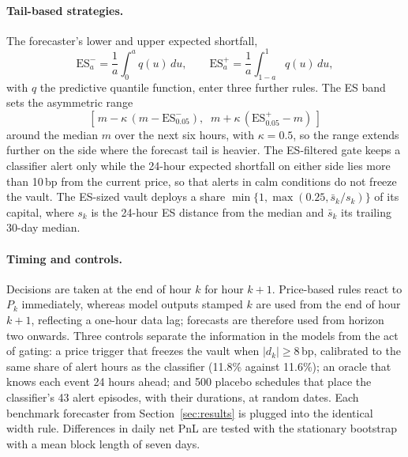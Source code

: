 \paragraph{Tail-based strategies.} The forecaster's lower and upper expected shortfall,
\begin{equation}
\mathrm{ES}^{-}_{a}=\frac{1}{a}\int_0^{a}q(u)\,du,\qquad
\mathrm{ES}^{+}_{a}=\frac{1}{a}\int_{1-a}^{1}q(u)\,du,
\end{equation}
with $q$ the predictive quantile function, enter three further rules. The ES band sets the asymmetric range
\begin{equation}
\left[\,m-\kappa\,(m-\mathrm{ES}^{-}_{0.05}),\;\; m+\kappa\,(\mathrm{ES}^{+}_{0.05}-m)\,\right]
\end{equation}
around the median $m$ over the next six hours, with $\kappa=0.5$, so the range extends further on
the side where the forecast tail is heavier. The ES-filtered gate keeps a classifier alert only
while the 24-hour expected shortfall on either side lies more than 10\,bp from the current
price, so that alerts in calm conditions do not freeze the vault. The ES-sized vault deploys a
share $\min\{1,\max(0.25,\bar s_k/s_k)\}$ of its capital, where $s_k$ is the 24-hour ES
distance from the median and $\bar s_k$ its trailing 30-day median.

\paragraph{Timing and controls.} Decisions are taken at the end of hour $k$ for hour $k+1$.
Price-based rules react to $P_k$ immediately, whereas model outputs stamped $k$ are used from
the end of hour $k+1$, reflecting a one-hour data lag; forecasts are therefore used from
horizon two onwards. Three controls separate the information in the models from the act of
gating: a price trigger that freezes the vault when $|d_k|\ge 8$\,bp, calibrated to the same
share of alert hours as the classifier (11.8\% against 11.6\%); an oracle that knows each
event 24 hours ahead; and 500 placebo schedules that place the classifier's 43 alert episodes,
with their durations, at random dates. Each benchmark forecaster from
Section~\ref{sec:results} is plugged into the identical width rule. Differences in daily net
PnL are tested with the stationary bootstrap \citep{PolitisRomano1994} with a mean block
length of seven days.

